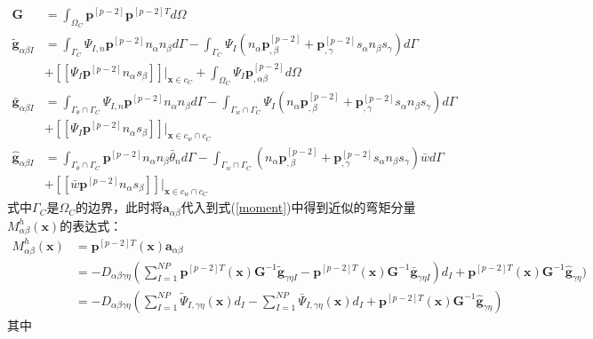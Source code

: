 \begin{subequations}
\begin{align}
\label{PG}\pmb{G}&=\int_{\Omega_C}\pmb{p}^{[p-2]}\pmb{p}^{[p-2]T}d\Omega\\
\label{Pg1}\tilde{\pmb g}_{\alpha\beta I}&=\int_{\Gamma_C}\Psi_{I,n}\pmb{p}^{[p-2]}n_{\alpha}n_{\beta}d\Gamma-\int_{\Gamma_C}\Psi_I(n_{\alpha}\pmb{p}^{[p-2]}_{,\beta}+\pmb{p}^{[p-2]}_{,\gamma}s_{\alpha}n_{\beta}s_{\gamma})d\Gamma \nonumber\\
&+[[\Psi_I\pmb{p}^{[p-2]}n_{\alpha}s_{\beta}]]\vert_{\pmb{x}\in c_C}+\int_{\Omega_C}\Psi_I\pmb{p}^{[p-2]}_{,\alpha\beta}d\Omega\\
\label{Pg2}\bar{\pmb g}_{\alpha\beta I}&=\int_{{\Gamma_{\theta}}\cap{\Gamma_C}}\Psi_{I,n}\pmb{p}^{[p-2]}n_{\alpha}n_{\beta}d\Gamma-\int_{{\Gamma_w}\cap{\Gamma_C}}\Psi_I(n_{\alpha}\pmb{p}^{[p-2]}_{,\beta}+\pmb{p}^{[p-2]}_{,\gamma}s_{\alpha}n_{\beta}s_{\gamma})d\Gamma\nonumber\\
&+[[\Psi_I\pmb{p}^{[p-2]}n_{\alpha}s_{\beta}]]\vert_{\pmb{x}\in{c_w}\cap{c_C}}\\
\label{Pg3}\hat{\pmb g}_{\alpha\beta I}&=\int_{{\Gamma_{\theta}}\cap{\Gamma_C}}\pmb{p}^{[p-2]}n_{\alpha}n_{\beta}\bar{\theta}_nd\Gamma-\int_{{\Gamma_w}\cap{\Gamma_C}}(n_{\alpha}\pmb{p}^{[p-2]}_{,\beta}+\pmb{p}^{[p-2]}_{,\gamma}s_{\alpha}n_{\beta}s_{\gamma})\bar{w}d\Gamma\nonumber\\
&+[[\bar{w}\pmb{p}^{[p-2]}n_{\alpha}s_{\beta}]]\vert_{\pmb{x}\in{c_w}\cap{c_C}}
\end{align}
\end{subequations}
式中$\Gamma_C$是$\Omega_C$的边界，此时将$\pmb{a}_{\alpha\beta}$代入到式(\ref{moment})中得到近似的弯矩分量$M^h_{\alpha\beta}(\pmb{x})$的表达式：
\begin{equation}
\begin{split}
M^h_{\alpha\beta}(\pmb{x})&=\pmb{p}^{[p-2]T}(\pmb{x})\pmb a_{\alpha\beta}\\
&=-D_{\alpha\beta\gamma\eta}(\sum_{I=1}^{N\!P}\pmb{p}^{[p-2]T}(\pmb x)\pmb G^{-1}\tilde{\pmb g}_{\gamma\eta I}-\pmb{p}^{[p-2]T}(\pmb x)\pmb G^{-1}\bar{\pmb g}_{\gamma\eta I})d_I+\pmb{p}^{[p-2]T}(\pmb x)\pmb G^{-1}\hat{\pmb g}_{\gamma\eta})\\
&=-D_{\alpha\beta\gamma\eta}(\sum_{I=1}^{N\!P}\tilde{\Psi}_{I,\gamma\eta}(\pmb x)d_I-\sum_{I=1}^{N\!P}\bar{\Psi}_{I,\gamma\eta}(\pmb{x})d_I+\pmb{p}^{[p-2]T}(\pmb x)\pmb G^{-1}\hat{\pmb g}_{\gamma\eta})
\end{split}
\end{equation}
其中
